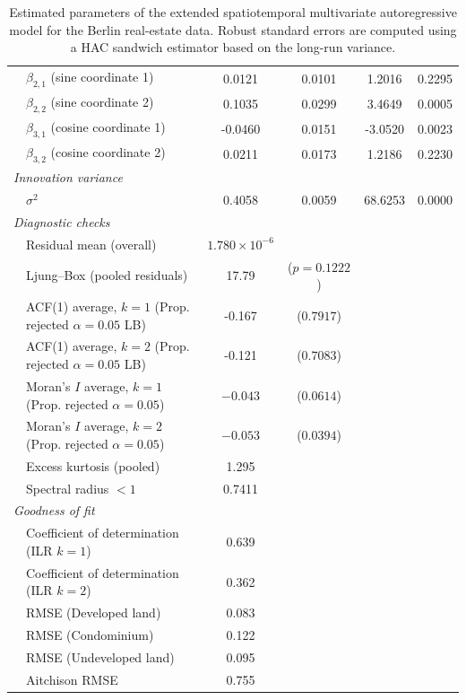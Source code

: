 \documentclass[12pt]{article}
\theoremstyle{plain}
\theoremstyle{definition}
\begin{document}
\begin{table}[t]
{\begin{tabular}{cl cccc}
& $\beta_{2,1}$ (sine coordinate 1) & 0.0121 & 0.0101 & 1.2016 & 0.2295 \\
& $\beta_{2,2}$ (sine coordinate 2) & 0.1035 & 0.0299 & 3.4649 & 0.0005 \\
& $\beta_{3,1}$ (cosine coordinate 1) & -0.0460 & 0.0151 & -3.0520 & 0.0023 \\
& $\beta_{3,2}$ (cosine coordinate 2) & 0.0211 & 0.0173 & 1.2186 & 0.2230 \\
\hline
\multicolumn{6}{l}{\emph{Innovation variance}} \\
& $\sigma^2$ & 0.4058 & 0.0059 & 68.6253 & 0.0000 \\
\hline
\multicolumn{6}{l}{\emph{Diagnostic checks}} \\
& Residual mean (overall) & $1.780 \times 10^{-6}$ &  &  &  \\[.1cm]
& Ljung--Box (pooled residuals) & 17.79  & ($p=0.1222$) &  &  \\
& ACF(1) average, $k=1$ (Prop. rejected $\alpha=0.05$ LB) & -0.167 & ($0.7917$) &  &  \\
& ACF(1) average, $k=2$ (Prop. rejected $\alpha=0.05$ LB) & -0.121 & ($0.7083$) &  &  \\
& Moran's $I$ average, $k=1$ (Prop. rejected $\alpha=0.05$) & $-0.043$ & ($0.0614$) &  &  \\
& Moran's $I$ average, $k=2$ (Prop. rejected $\alpha=0.05$) & $-0.053$ & ($0.0394$) &  &  \\
& Excess kurtosis (pooled) & 1.295 &  &  &  \\
& Spectral radius $<1$ & 0.7411 &  &  &  \\
\hline
\multicolumn{6}{l}{\emph{Goodness of fit}} \\
& Coefficient of determination (ILR $k=1$) & 0.639 &  &  &  \\
& Coefficient of determination (ILR $k=2$) & 0.362 &  &  &  \\
& RMSE (Developed land) & 0.083 &  &  &  \\
& RMSE (Condominium) & 0.122 &  &  &  \\
& RMSE (Undeveloped land) & 0.095 &  &  &  \\
& Aitchison RMSE & 0.755 &  &  &  \\
\hline
\end{tabular}
}
\caption{Estimated parameters of the extended spatiotemporal multivariate autoregressive model for the Berlin real-estate data. Robust standard errors are computed using a HAC sandwich estimator based on the long-run variance.}
\label{tab:results_berlin}
\end{table}
\end{document}
